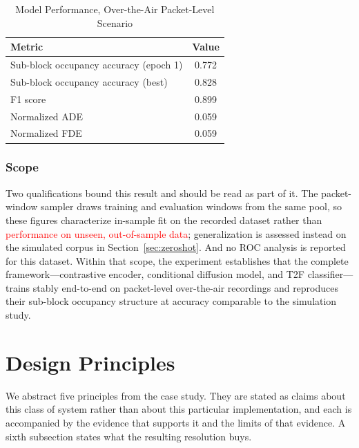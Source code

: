 \documentclass[lettersize,journal]{IEEEtran}
\newcommand{\red}[1]{\textcolor{red}{#1}}
\begin{document}
\begin{table}[!t]
\centering
\caption{Model Performance, Over-the-Air Packet-Level Scenario}
\label{tab:ota}
\renewcommand{\arraystretch}{1.2}
\begin{tabular}{@{}lc@{}}
\toprule
\textbf{Metric} & \textbf{Value} \\
\midrule
Sub-block occupancy accuracy (epoch 1) & 0.772 \\
Sub-block occupancy accuracy (best)    & 0.828 \\
F1 score                               & 0.899 \\
Normalized ADE                         & 0.059 \\
Normalized FDE                         & 0.059 \\
\bottomrule
\end{tabular}
\end{table}

\subsubsection{\textbf{Scope}}
Two qualifications bound this result and should be read as part of it. The
packet-window sampler draws training and evaluation windows from the same pool,
so these figures characterize in-sample fit on the recorded dataset rather than \red{performance on unseen, out-of-sample data}; generalization is assessed instead on the simulated
corpus in Section~\ref{sec:zeroshot}. And no ROC analysis is reported for this
dataset. Within that scope, the experiment establishes that the complete
framework---contrastive encoder, conditional diffusion model, and T2F
classifier---trains stably end-to-end on packet-level over-the-air recordings
and reproduces their sub-block occupancy structure at accuracy comparable to the
simulation study.

\section{\textbf{Design Principles}}

We abstract five principles from the case study. They are stated as
claims about this class of system rather than about this particular
implementation, and each is accompanied by the evidence that supports it
and the limits of that evidence. A sixth subsection states what the
resulting resolution buys.
\end{document}
